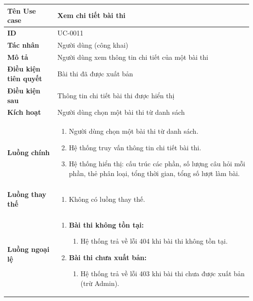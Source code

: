 {
\small
\renewcommand{\arraystretch}{1.15}

\begin{tabularx}{\textwidth}{|>{\raggedright\arraybackslash}p{3.5cm}|>{\raggedright\arraybackslash}X|}
\hline
\textbf{Tên Use case} & Xem chi tiết bài thi \\
\hline
\textbf{ID} & UC-0011 \\
\hline
\textbf{Tác nhân} & Người dùng (công khai) \\
\hline
\textbf{Mô tả} & Người dùng xem thông tin chi tiết của một bài thi \\
\hline
\textbf{Điều kiện tiên quyết} & Bài thi đã được xuất bản \\
\hline
\textbf{Điều kiện sau} & Thông tin chi tiết bài thi được hiển thị \\
\hline
\textbf{Kích hoạt} & Người dùng chọn một bài thi từ danh sách \\
\hline
\textbf{Luồng chính} &
\begin{enumerate}
    \item Người dùng chọn một bài thi từ danh sách.
    \item Hệ thống truy vấn thông tin chi tiết bài thi.
    \item Hệ thống hiển thị: cấu trúc các phần, số lượng câu hỏi mỗi phần, thẻ phân loại, tổng thời gian, tổng số lượt làm bài.
\end{enumerate} \\
\hline
\textbf{Luồng thay thế} &
\begin{enumerate}
    \item Không có luồng thay thế.
\end{enumerate} \\
\hline
\textbf{Luồng ngoại lệ} &
\begin{enumerate}
    \item \textbf{Bài thi không tồn tại:}
    \begin{enumerate}
        \item[2Err.] Hệ thống trả về lỗi 404 khi bài thi không tồn tại.
    \end{enumerate}
    \item \textbf{Bài thi chưa xuất bản:}
    \begin{enumerate}
        \item[2Err2.] Hệ thống trả về lỗi 403 khi bài thi chưa được xuất bản (trừ Admin).
    \end{enumerate}
\end{enumerate} \\
\hline
\end{tabularx}
}

